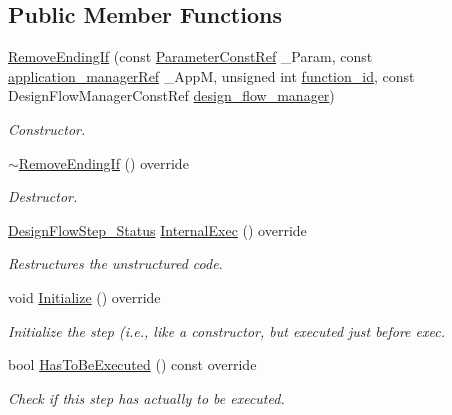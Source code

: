 \subsection*{Public Member Functions}
\begin{DoxyCompactItemize}
\item 
\hyperlink{classRemoveEndingIf_ac2051e107a830095132efb28fa2b38b4}{Remove\+Ending\+If} (const \hyperlink{Parameter_8hpp_a37841774a6fcb479b597fdf8955eb4ea}{Parameter\+Const\+Ref} \+\_\+\+Param, const \hyperlink{application__manager_8hpp_a04ccad4e5ee401e8934306672082c180}{application\+\_\+manager\+Ref} \+\_\+\+AppM, unsigned int \hyperlink{classFunctionFrontendFlowStep_a58ef2383ad1a212a8d3f396625a4b616}{function\+\_\+id}, const Design\+Flow\+Manager\+Const\+Ref \hyperlink{classDesignFlowStep_ab770677ddf087613add30024e16a5554}{design\+\_\+flow\+\_\+manager})
\begin{DoxyCompactList}\small\item\em Constructor. \end{DoxyCompactList}\item 
\hyperlink{classRemoveEndingIf_ac8c1c51f1225d0aec0afd4329c913395}{$\sim$\+Remove\+Ending\+If} () override
\begin{DoxyCompactList}\small\item\em Destructor. \end{DoxyCompactList}\item 
\hyperlink{design__flow__step_8hpp_afb1f0d73069c26076b8d31dbc8ebecdf}{Design\+Flow\+Step\+\_\+\+Status} \hyperlink{classRemoveEndingIf_a22b33df1189bae1af234c829c44b15b2}{Internal\+Exec} () override
\begin{DoxyCompactList}\small\item\em Restructures the unstructured code. \end{DoxyCompactList}\item 
void \hyperlink{classRemoveEndingIf_a31a37f3146c2637dfe6ea70d51269574}{Initialize} () override
\begin{DoxyCompactList}\small\item\em Initialize the step (i.\+e., like a constructor, but executed just before exec. \end{DoxyCompactList}\item 
bool \hyperlink{classRemoveEndingIf_a02a434d8972c1582197d7e12f136c652}{Has\+To\+Be\+Executed} () const override
\begin{DoxyCompactList}\small\item\em Check if this step has actually to be executed. \end{DoxyCompactList}\end{DoxyCompactItemize}
